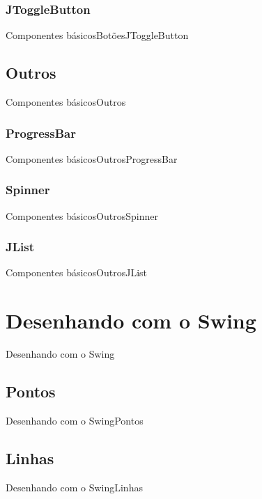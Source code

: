 \documentclass[10pt]{beamer}
\begin{document}
\subsubsection{JToggleButton}
\begin{frame}{Componentes básicos}{Botões}{JToggleButton}
\end{frame}{}
\subsection{Outros}
\begin{frame}{Componentes básicos}{Outros}
\end{frame}{}
\subsubsection{ProgressBar}
\begin{frame}{Componentes básicos}{Outros}{ProgressBar}
\end{frame}{}
\subsubsection{Spinner}
\begin{frame}{Componentes básicos}{Outros}{Spinner}
\end{frame}{}
\subsubsection{JList}
\begin{frame}{Componentes básicos}{Outros}{JList}
\end{frame}{}
\section{Desenhando com o Swing}
\begin{frame}{Desenhando com o Swing}{}
\end{frame}{}
\subsection{Pontos}
\begin{frame}{Desenhando com o Swing}{Pontos}
\end{frame}{}
\subsection{Linhas}
\begin{frame}{Desenhando com o Swing}{Linhas}
\end{frame}{}
\end{document}
